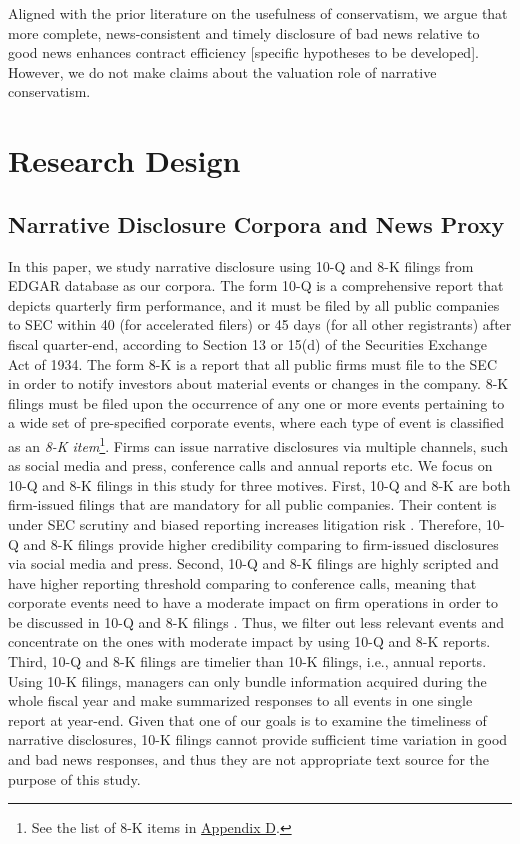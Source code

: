 \documentclass[a4paper]{article}
\begin{document}
\begin{spacing}{2}
Aligned with the prior literature on the usefulness of conservatism, we argue that more complete, news-consistent and timely disclosure of bad news relative to good news enhances contract efficiency [specific hypotheses to be developed]. However, we do not make claims about the valuation role of narrative conservatism.

\section{Research Design}
\subsection{Narrative Disclosure Corpora and News Proxy} \label{sec3.1}
In this paper, we study narrative disclosure using 10-Q and 8-K filings from EDGAR database as our corpora. The form 10-Q is a comprehensive report that depicts quarterly firm performance, and it must be filed by all public companies to SEC within 40 (for accelerated filers) or 45 days (for all other registrants) after fiscal quarter-end, according to Section 13 or 15(d) of the Securities Exchange Act of 1934. The form 8-K is a report that all public firms must file to the SEC in order to notify investors about material events or changes in the company. 8-K filings must be filed upon the occurrence of any one or more events pertaining to a wide set of pre-specified corporate events, where each type of event is classified as an \textit{8-K item}\footnote{See the list of 8-K items in \hyperref[appd]{Appendix D}.}. Firms can issue narrative disclosures via multiple channels, such as social media and press, conference calls and annual reports etc. We focus on 10-Q and 8-K filings in this study for three motives. First, 10-Q and 8-K are both firm-issued filings that are mandatory for all public companies. Their content is under SEC scrutiny and biased reporting increases litigation risk \citep*{rogersDisclosureToneShareholder2011, cazierWhenAreFirms2020}. Therefore, 10-Q and 8-K filings provide higher credibility comparing to firm-issued disclosures via social media and press. Second, 10-Q and 8-K filings are highly scripted and have higher reporting threshold comparing to conference calls, meaning that corporate events need to have a moderate impact on firm operations in order to be discussed in 10-Q and 8-K filings \citep*{hassanFirmLevelPoliticalRisk2019}. Thus, we filter out less relevant events and concentrate on the ones with moderate impact by using 10-Q and 8-K reports. Third, 10-Q and 8-K filings are timelier than 10-K filings, i.e., annual reports. Using 10-K filings, managers can only bundle information acquired during the whole fiscal year and make summarized responses to all events in one single report at year-end. Given that one of our goals is to examine the timeliness of narrative disclosures, 10-K filings cannot provide sufficient time variation in good and bad news responses, and thus they are not appropriate text source for the purpose of this study.


\end{spacing}
\end{document}
